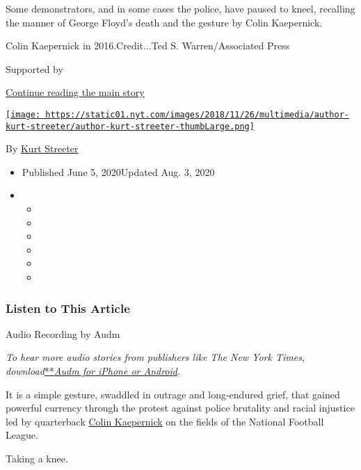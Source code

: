 Some demonstrators, and in some cases the police, have paused to kneel,
recalling the manner of George Floyd's death and the gesture by Colin
Kaepernick.

Colin Kaepernick in 2016.Credit...Ted S. Warren/Associated Press

Supported by

\protect\hyperlink{after-sponsor}{Continue reading the main story}

\href{https://www.nytimes.com/by/kurt-streeter}{\texttt{[image: https://static01.nyt.com/images/2018/11/26/multimedia/author-kurt-streeter/author-kurt-streeter-thumbLarge.png]}}

By \href{https://www.nytimes.com/by/kurt-streeter}{Kurt Streeter}

\begin{itemize}
\item
  Published June 5, 2020Updated Aug. 3, 2020
\item
  \begin{itemize}
  \item
  \item
  \item
  \item
  \item
  \item
  \end{itemize}
\end{itemize}

\hypertarget{listen-to-this-article}{%
\subsubsection{Listen to This Article}\label{listen-to-this-article}}

Audio Recording by Audm

\emph{To hear more audio stories from publishers like The New York
Times,
download}\href{https://www.audm.com/?utm_source=nytmag\&utm_medium=embed\&utm_campaign=left_behind_draper}{**}\href{https://www.audm.com/?utm_source=nyt\&utm_medium=embed\&utm_campaign=kneeling_nfl_protests}{\emph{Audm
for iPhone or Android}}\emph{.}

It is a simple gesture, swaddled in outrage and long-endured grief, that
gained powerful currency through the protest against police brutality
and racial injustice led by quarterback
\href{https://www.nytimes.com/2020/08/03/us/navy-seal-museum-kaepernick.html}{Colin
Kaepernick} on the fields of the National Football League.

Taking a knee.

